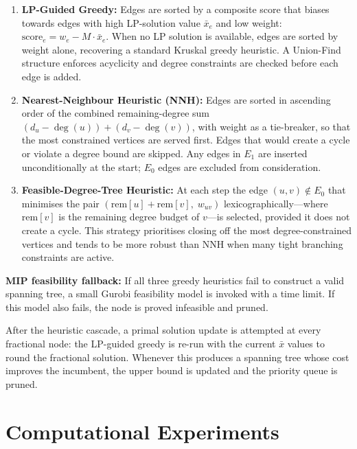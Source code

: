 \documentclass[12pt]{article}
\begin{document}
\begin{enumerate}
  \item \textbf{LP-Guided Greedy:}  Edges are sorted by a composite score that biases towards edges with high LP-solution value $\bar{x}_e$ and low weight: $\text{score}_e = w_e - M \cdot \bar{x}_e$.  When no LP solution is available, edges are sorted by weight alone, recovering a standard Kruskal greedy heuristic.  A Union-Find structure enforces acyclicity and degree constraints are checked before each edge is added.

  \item \textbf{Nearest-Neighbour Heuristic (NNH):}  Edges are sorted in ascending order of the combined remaining-degree sum $(d_u - \deg(u)) + (d_v - \deg(v))$, with weight as a tie-breaker, so that the most constrained vertices are served first.  Edges that would create a cycle or violate a degree bound are skipped.  Any edges in $E_1$ are inserted unconditionally at the start; $E_0$ edges are excluded from consideration.

  \item \textbf{Feasible-Degree-Tree Heuristic:}  At each step the edge $(u,v) \notin E_0$ that minimises the pair $(\text{rem}[u] + \text{rem}[v],\; w_{uv})$ lexicographically—where $\text{rem}[v]$ is the remaining degree budget of $v$—is selected, provided it does not create a cycle.  This strategy prioritises closing off the most degree-constrained vertices and tends to be more robust than NNH when many tight branching constraints are active.
\end{enumerate}

\medskip
\noindent \textbf{MIP feasibility fallback:}  If all three greedy heuristics fail to construct a valid spanning tree, a small Gurobi feasibility model is invoked with a time limit. If this model also fails, the node is proved infeasible and pruned.

\medskip
\noindent After the heuristic cascade, a primal solution update is attempted at every fractional node: the LP-guided greedy is re-run with the current $\bar{x}$ values to round the fractional solution.  Whenever this produces a spanning tree whose cost improves the incumbent, the upper bound is updated and the priority queue is pruned.



\section{Computational Experiments}
\end{document}
